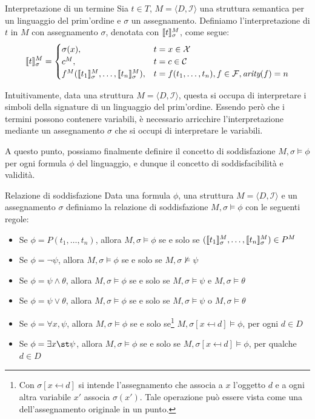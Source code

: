 \begin{definition}{Interpretazione di un termine}
  Sia \(t\in T\), \(M = \langle D, \mathcal{I} \rangle\) una struttura semantica per un linguaggio del prim'ordine e \(\sigma\) un assegnamento. Definiamo l'interpretazione di \(t\) in \(M\) con assegnamento \(\sigma\), denotata con \(\den{t}[M][\sigma]\), come segue:
  \[\den{t}[M][\sigma] = \begin{cases}
    \sigma(x), & t = x\in\VarSyms\\
    c^M, & t = c\in\ConstSyms\\
    f^M(\den{t_1}[M][\sigma], \ldots, \den{t_n}[M][\sigma]), & t = f(t_1,\ldots,t_n), f\in\FuncSyms, \arty(f)=n
  \end{cases}\]
\end{definition}

Intuitivamente, data una struttura \(M = \langle D, \mathcal{I} \rangle\), questa si occupa di interpretare i simboli della signature di un linguaggio del prim'ordine. Essendo però che i termini possono contenere variabili, è necessario arricchire l'interpretazione mediante un assegnamento \(\sigma\) che si occupi di interpretare le variabili. 

A questo punto, possiamo finalmente definire il concetto di soddisfazione \(M,\sigma\models \phi\) per ogni formula \(\phi\) del linguaggio, e dunque il concetto di soddisfacibilità e validità.

\begin{definition}{Relazione di soddisfazione}
  Data una formula \(\phi\), una struttura \(M = \langle D, \mathcal{I} \rangle\) e un assegnamento \(\sigma\) definiamo la relazione di soddisfazione \(M,\sigma\models \phi\) con le seguenti regole:
  \begin{itemize}
    \item Se \(\phi = P(t_1,\ldots,t_n)\), allora \(M,\sigma\models \phi\) se e solo se \((\den{t_1}[M][\sigma], \ldots, \den{t_n}[M][\sigma]) \in P^M\)
    \item Se \(\phi = \neg \psi\), allora \(M,\sigma\models \phi\) se e solo se \(M,\sigma\not\models \psi\)
    \item Se \(\phi = \psi\land\theta\), allora \(M,\sigma\models \phi\) se e solo se \(M,\sigma\models \psi\) e \(M,\sigma\models \theta\)
    \item Se \(\phi = \psi\lor\theta\), allora \(M,\sigma\models \phi\) se e solo se \(M,\sigma\models \psi\) o \(M,\sigma\models \theta\)
    \item Se \(\phi = \forall x, \psi\), allora \(M,\sigma\models \phi\) se e solo se\footnote{Con \(\sigma[x\mapsfrom d]\) si intende l'assegnamento che associa a \(x\) l'oggetto \(d\) e a ogni altra variabile \(x'\) associa \(\sigma(x')\). Tale operazione può essere vista come una  dell'assegnamento originale in un punto.} \(M,\sigma[x \mapsfrom d]\models \phi\), per ogni \(d\in D\)
    \item Se \(\phi = \exists x\st \psi\), allora \(M,\sigma\models \phi\) se e solo se \(M,\sigma[x \mapsfrom d]\models \phi\), per qualche \(d\in D\)
  \end{itemize}
\end{definition}

